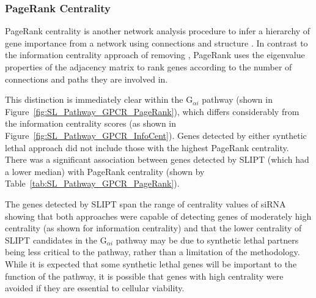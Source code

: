 \FloatBarrier

\subsubsection{PageRank Centrality}  \label{chapt4:Network_PageRank}

\FloatBarrier

\gls{PageRank centrality} is another network analysis procedure to infer a hierarchy of gene importance from a network using connections and structure \citep{Brin1998}. In contrast to the \gls{information centrality} approach of removing , PageRank uses the eigenvalue properties of the adjacency matrix to rank genes according to the number of connections and paths they are involved in. 

This distinction is immediately clear within the G$_{\alpha i}$ \gls{pathway} (shown in Figure~\ref{fig:SL_Pathway_GPCR_PageRank}), which differs considerably from the \gls{information centrality} scores (as shown in Figure~\ref{fig:SL_Pathway_GPCR_InfoCent}). 
Genes detected by either \gls{synthetic lethal} approach did not include those with the highest PageRank centrality. There was a significant association between genes detected by \gls{SLIPT} (which had a lower median) with PageRank \gls{centrality} (shown by Table~\ref{tab:SL_Pathway_GPCR_PageRank}).

The genes detected by \gls{SLIPT} span the range of \gls{centrality} values of \gls{siRNA} showing that both approaches were capable of detecting genes of moderately high \gls{centrality} (as shown for information centrality) and that the lower \gls{centrality} of \gls{SLIPT} candidates in the G$_{\alpha i}$ \gls{pathway} may be due to \gls{synthetic lethal} partners being less critical to the \gls{pathway}, rather than a limitation of the methodology. While it is expected that some \gls{synthetic lethal} genes will be important to the function of the \gls{pathway}, it is possible that genes with high \gls{centrality} were avoided if they are \gls{essential} to cellular viability.


